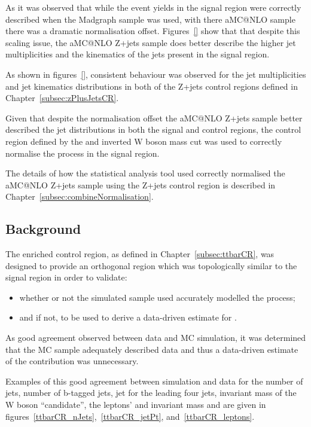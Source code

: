 As it was observed that while the event yields in the signal region were correctly described when the Madgraph sample was used, with there aMC@NLO sample there was a dramatic normalisation offset.
Figures~\ref{} show that that despite this scaling issue, the aMC@NLO Z+jets sample does better describe the higher jet multiplicities and the kinematics of the jets present in the signal region.

As shown in figures~\ref{}, consistent behaviour was observed for the jet multiplicities and jet kinematics distributions in both of the Z+jets control regions defined in Chapter~\ref{subsec:zPlusJetsCR}.

Given that despite the normalisation offset the aMC@NLO Z+jets sample better described the jet distributions in both the signal and control regions, the control region defined by the \MET and inverted W boson mass cut was used to correctly normalise the process in the signal region.

The details of how the statistical analysis tool used correctly normalised the aMC@NLO Z+jets sample using the Z+jets control region is described in Chapter~\ref{subsec:combineNormalisation}.

\subsection{\ttbar Background}\label{subsec:ttbarEstimation}
The \ttbar enriched control region, as defined in Chapter~\ref{subsec:ttbarCR}, was designed to provide an orthogonal region which was topologically similar to the signal region in order to validate:
\begin{itemize}
\item whether or not the simulated \ttbar sample used accurately modelled the \ttbar process;
\item and if not, to be used to derive a data-driven estimate for \ttbar.
\end{itemize}

As good agreement observed between data and MC simulation, it was determined that the \ttbar MC sample adequately described data and thus a data-driven estimate of the \ttbar contribution was unnecessary.

Examples of this good agreement between simulation and data for the number of jets, number of b-tagged jets, jet \pT for the leading four jets, invariant mass of the W boson ``candidate'', the leptons' \pt and invariant mass and \pt are given in figures~\ref{ttbarCR_nJets},~\ref{ttbarCR_jetPt}, and~\ref{ttbarCR_leptons}.

